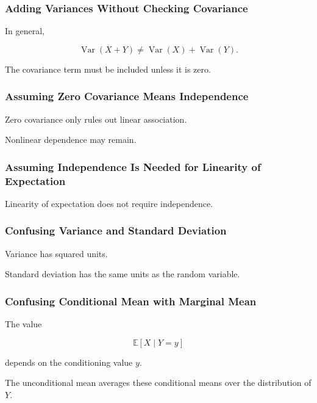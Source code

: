 \subsubsection{Adding Variances Without Checking Covariance}

In general,

\[
\operatorname{Var}(X+Y)
\neq
\operatorname{Var}(X)
+
\operatorname{Var}(Y).
\]

The covariance term must be included unless it is zero.

\subsubsection{Assuming Zero Covariance Means Independence}

Zero covariance only rules out linear association.

Nonlinear dependence may remain.

\subsubsection{Assuming Independence Is Needed for Linearity of Expectation}

Linearity of expectation does not require independence.

\subsubsection{Confusing Variance and Standard Deviation}

Variance has squared units.

Standard deviation has the same units as the random variable.

\subsubsection{Confusing Conditional Mean with Marginal Mean}

The value

\[
\mathbb{E}[X\mid Y=y]
\]

depends on the conditioning value \(y\).

The unconditional mean averages these conditional means over the
distribution of \(Y\).

